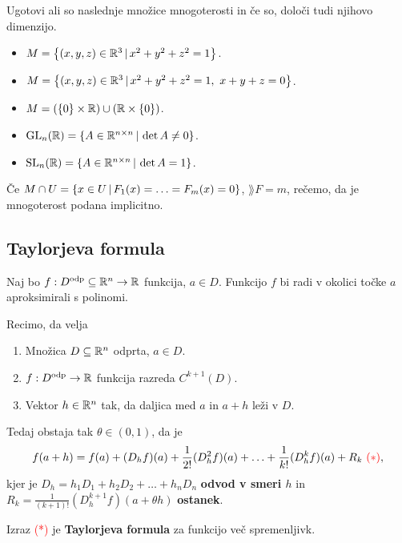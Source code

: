 \begin{zgled}
    Ugotovi ali so naslednje množice mnogoterosti in če so, določi tudi njihovo dimenzijo.
    \begin{itemize}
        \item $M = \left\{(x,y,z) \in \mathbb{R}^3 \,|\, x^2+y^2+z^2 = 1\right\}$.
        \item $M = \left\{(x,y,z) \in \mathbb{R}^3 \,|\, x^2+y^2+z^2 = 1, \ x+y+z = 0\right\}$.
        \item $M = (\left\{0\right\} \times \mathbb{R}) \cup (\mathbb{R} \times \left\{0\right\})$.
        \item $\operatorname{GL}_n(\mathbb{R}) = \left\{A \in \mathbb{R}^{n \times n} \,|\, \det A \neq 0\right\}$.
        \item $\operatorname{SL}_n(\mathbb{R}) = \left\{A \in \mathbb{R}^{n \times n} \,|\, \det A = 1\right\}$.
    \end{itemize}
\end{zgled}

\begin{opomba}
    Če $M \cap U = \left\{x \in U \,|\, F_1(x) = \ldots = F_m(x) = 0\right\}$, \(\rang F = m\), rečemo, da je mnogoterost podana implicitno.
\end{opomba}

\newpage
\subsection{Taylorjeva formula}
Naj bo $f: D^{\text{odp}} \subseteq \mathbb{R}^n \to \mathbb{R}$ funkcija, $a \in D$. Funkcijo $f$ bi radi v okolici točke $a$ aproksimirali s polinomi.

\begin{izrek}
    Recimo, da velja
    \begin{enumerate}
        \item Množica $D \subseteq \mathbb{R}^n$ odprta, $a \in D$.
        \item $f: D^{\text{odp}} \to \mathbb{R}$ funkcija razreda $C^{k+1}(D)$.
        \item Vektor $h \in \mathbb{R}^n$ tak, da daljica med $a$ in $a+h$ leži v $D$.
    \end{enumerate}
    Tedaj obstaja tak $\theta \in (0,1)$, da je 
    $$f(a+h) = f(a) + (D_hf)(a) + \frac{1}{2!}(D_h^2f)(a) + \ldots + \frac{1}{k!} (D_h^kf)(a) + R_k \ \textcolor{red}{(*)},$$
    kjer je $D_h = h_1D_1 + h_2D_2 + \ldots + h_nD_n$ \textbf{odvod v smeri $h$} in $R_k = \frac{1}{(k+1)!} (D_h^{k+1}f)(a + \theta h)$ \textbf{ostanek}.

    Izraz \textcolor{red}{(*)} je \textbf{Taylorjeva formula} za funkcijo več spremenljivk.
\end{izrek}

